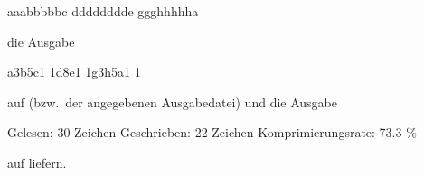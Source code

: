\begin{osuefmtcode}
      aaabbbbbc
      dddddddde
      ggghhhhha

\end{osuefmtcode}

die Ausgabe

\begin{osuefmtcode}
      a3b5c1
      1d8e1
      1g3h5a1
      1
\end{osuefmtcode}

auf  (bzw.\ der angegebenen Ausgabedatei) und die Ausgabe

\begin{osuefmtcode}
      Gelesen:          30 Zeichen
      Geschrieben:      22 Zeichen
      Komprimierungsrate:   73.3 \%
\end{osuefmtcode}

auf  liefern.


\osueguidelinesone



